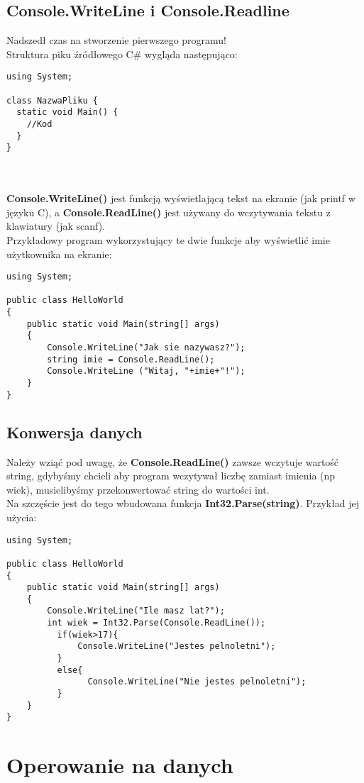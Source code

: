 \documentclass[a4paper]{article}
\theoremstyle{definition}
\begin{document}
\subsection{Console.WriteLine i Console.Readline}
Nadszedł czas na stworzenie pierwszego programu!
\\Struktura piku źródłowego C\# wygląda następująco:
\lstset{language=C}
\begin{lstlisting}[frame=single]
using System;

class NazwaPliku {
  static void Main() {
    //Kod
  }
}
\end{lstlisting}
\\	\\\textbf{Console.WriteLine()} jest funkcją wyświetlającą tekst na ekranie (jak printf w języku C), a \textbf{Console.ReadLine()} jest używany do wczytywania tekstu z klawiatury (jak scanf).
\\Przykładowy program wykorzystujący te dwie funkcje aby wyświetlić imie użytkownika na ekranie:
\lstset{language=C}
\begin{lstlisting}[frame=single]
using System;

public class HelloWorld
{
    public static void Main(string[] args)
    {
        Console.WriteLine("Jak sie nazywasz?");
        string imie = Console.ReadLine();
        Console.WriteLine ("Witaj, "+imie+"!");
    }
}
\end{lstlisting}
\subsection{Konwersja danych}
Należy wziąć pod uwagę, że \textbf{Console.ReadLine()} zawsze wczytuje wartość string, gdybyśmy chcieli aby program wczytywał liczbę zamiast imienia (np wiek), musielibyśmy przekonwertować string do wartości int.\\
Na szczęście jest do tego wbudowana funkcja \textbf{Int32.Parse(string)}. Przykład jej użycia:\\
\begin{lstlisting}[frame=single]
using System;

public class HelloWorld
{
    public static void Main(string[] args)
    {
        Console.WriteLine("Ile masz lat?");
        int wiek = Int32.Parse(Console.ReadLine());
	      if(wiek>17){
        	  Console.WriteLine("Jestes pelnoletni");
	      }
	      else{
		        Console.WriteLine("Nie jestes pelnoletni");
	      }
    }
}
\end{lstlisting}
\section{Operowanie na danych}
\end{document}
